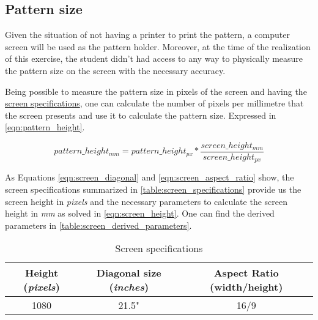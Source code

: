 \documentclass[
a4paper,
12pt,
]{article}
\begin{document}
\subsection{Pattern size}
\label{subsec:pattern_size}
Given the situation of not having a printer to print the pattern, a computer screen will be used as the pattern holder. Moreover, at the time of the realization of this exercise, the student didn't had access to any way to physically measure the pattern size on the screen with the necessary accuracy.

Being possible to measure the pattern size in pixels of the screen and having the \href{https://www.samsung.com/latin_en/business/business-monitors/led-ls22d300hy/}{screen specifications}, one can calculate the number of pixels per millimetre that the screen presents and use it to calculate the pattern size. Expressed in \autoref{eqn:pattern_height}.

\begin{equation}
\label{eqn:pattern_height}
pattern\_height_{mm} = pattern\_height_{px}*\frac{screen\_height_{mm}}{screen\_height_{px}}
\end{equation}

As Equations \ref{eqn:screen_diagonal} and \ref{eqn:screen_aspect_ratio} show, the screen specifications summarized in \autoref{table:screen_specifications} provide us the screen height in \emph{pixels} and the necessary parameters to calculate the screen height in \emph{mm} as solved in \autoref{eqn:screen_height}. One can find the derived parameters in \autoref{table:screen_derived_parameters}.

\begin{table}[h]
\centering
\begin{tabular}{c|c|c}
\hline
\textbf{Height (\emph{pixels})}	
	& \textbf{Diagonal size (\emph{inches})}
		& \textbf{Aspect Ratio (width/height)}\\
\hline
1080	
	& 21.5"	
		& 16/9	\\
\hline
\end{tabular}
\caption{Screen specifications}
\label{table:screen_specifications}
\end{table}
\end{document}
